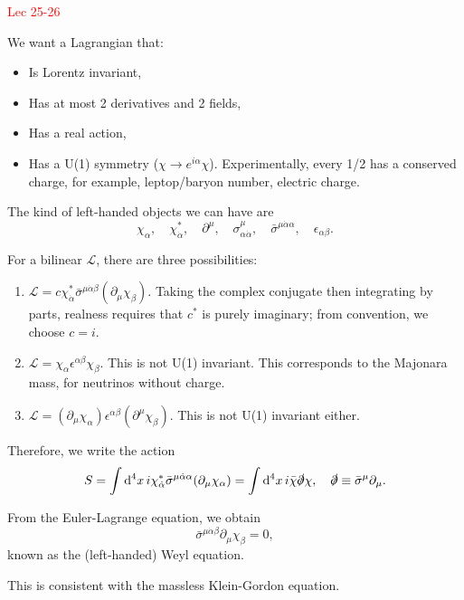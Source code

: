 \documentclass{article}
\begin{document}
\textcolor{red}{Lec 25-26}

We want a Lagrangian that:
\begin{itemize}
    \item Is Lorentz invariant,
    \item Has at most 2 derivatives and 2 fields,
    \item Has a real action,
    \item Has a U(1) symmetry ($\chi\to e^{i\alpha}\chi$). Experimentally, every 1/2 has a conserved charge, for example, leptop/baryon number, electric charge.
\end{itemize}

The kind of left-handed objects we can have are 
$$\chi_\alpha,\quad\chi^*_{\dot\alpha},\quad\partial^\mu,\quad\sigma^\mu_{\alpha\dot\alpha},\quad\bar\sigma^{\mu\dot\alpha\alpha},\quad\epsilon_{\alpha\beta}.$$

For a bilinear $\mathcal L$, there are three possibilities:
\begin{enumerate}
    \item $\mathcal L=c\chi^*_{\dot\alpha}\bar\sigma^{\mu\dot\alpha\beta}(\partial_\mu\chi_\beta)$. Taking the complex conjugate then integrating by parts, realness requires that $c^*$ is purely imaginary; from convention, we choose $c=i$.
    \item $\mathcal L=\chi_\alpha\epsilon^{\alpha\beta}\chi_\beta$. This is not U(1) invariant. This corresponds to the Majonara mass, for neutrinos without charge.
    \item $\mathcal L=(\partial_\mu\chi_\alpha)\epsilon^{\alpha\beta}(\partial^\mu\chi_\beta)$. This is not U(1) invariant either.
\end{enumerate}
Therefore, we write the action
\begin{equation}
    S=\int\dd^4x\,i\chi^*_{\dot\alpha}\bar\sigma^{\mu\dot\alpha\alpha}(\partial_\mu\chi_\alpha)=\int\dd^4x\,i\bar\chi\slashed\partial\chi,\quad\slashed\partial\equiv\bar\sigma^\mu\partial_\mu.
\end{equation}

From the Euler-Lagrange equation, we obtain
\begin{equation}
    \bar\sigma^{\mu\dot\alpha\beta}\partial_\mu\chi_\beta=0,
\end{equation}
known as the (left-handed) Weyl equation.

This is consistent with the massless Klein-Gordon equation. 
\end{document}
